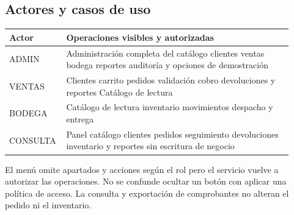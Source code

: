 \subsection{Actores y casos de uso}
\begingroup\small
\noindent
\begin{tabular}{@{}>{\raggedright\arraybackslash}p{0.15\linewidth}>{\raggedright\arraybackslash}p{0.77\linewidth}@{}}
\toprule
\textbf{Actor} & \textbf{Operaciones visibles y autorizadas}\\
\midrule
ADMIN & Administración completa del catálogo clientes ventas bodega reportes auditoría y opciones de demostración\\[3pt]
VENTAS & Clientes carrito pedidos validación cobro devoluciones y reportes Catálogo de lectura\\[3pt]
BODEGA & Catálogo de lectura inventario movimientos despacho y entrega\\[3pt]
CONSULTA & Panel catálogo clientes pedidos seguimiento devoluciones inventario y reportes sin escritura de negocio\\[3pt]
\bottomrule
\end{tabular}
\par\endgroup

El menú omite apartados y acciones según el rol pero el servicio vuelve a autorizar las operaciones. No se confunde ocultar un botón con aplicar una política de acceso. La consulta y exportación de comprobantes no alteran el pedido ni el inventario.

\FloatBarrier
